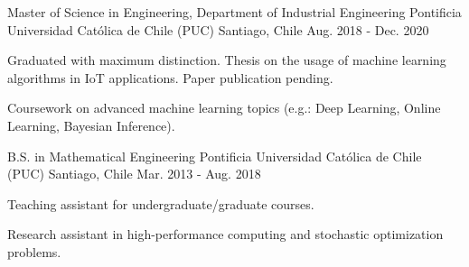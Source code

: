 

\begin{cventries}
\cventry
{Master of Science in Engineering, Department of Industrial Engineering} %
{Pontificia Universidad Católica de Chile (PUC)} %
{Santiago, Chile} %
{Aug. 2018 - Dec. 2020} %
{
  \begin{cvitems} %
    \item {Graduated with maximum distinction. Thesis on the usage of machine learning algorithms in IoT applications. Paper publication pending.}
    \item {Coursework on advanced machine learning topics (e.g.: Deep Learning, Online Learning, Bayesian Inference).} 
  \end{cvitems}
}

  \cventry
    {B.S. in Mathematical Engineering} %
    {Pontificia Universidad Católica de Chile (PUC)} %
    {Santiago, Chile} %
    {Mar. 2013 - Aug. 2018} %
    {
      \begin{cvitems} %
        \item {Teaching assistant for undergraduate/graduate courses.}
        \item {Research assistant in high-performance computing and stochastic optimization problems.}
      \end{cvitems}
    }

\end{cventries}
